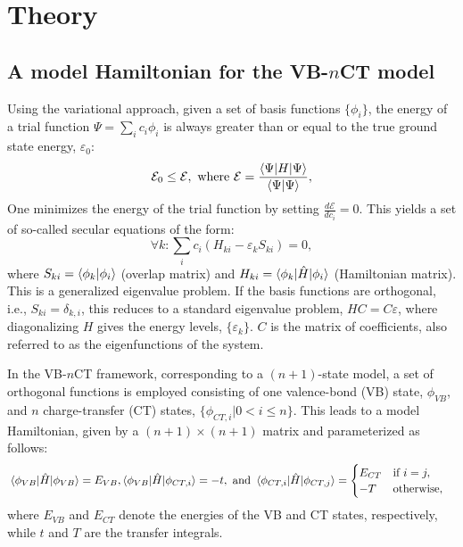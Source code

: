 \documentclass[journal=jpcafh]{achemso}
\begin{document}
\section{Theory \label{sec:theory}}

\subsection{A model Hamiltonian for the VB-$n$CT model}

Using the variational approach, given a set of basis functions $\{\phi_i\}$, the energy of a trial function $\Psi = \sum_i c_i \phi_i$ is always greater than or equal to the true ground state energy, $\varepsilon_0$:\begin{equation}
	\mathcal E_0 \leq 	\mathcal E, \text{ where }	\mathcal E = \frac{\braket{\Psi|H|\Psi}}{\braket{\Psi|\Psi}}, \label{eq:variational}
\end{equation}
One minimizes the energy of the trial function by setting $\frac{d	\mathcal E}{dc_i} = 0$. 
This yields a set of so-called secular equations of the form:\begin{equation}
	\forall k: \sum_i c_i (H_{ki} - \varepsilon_k S_{ki}) = 0, 
\end{equation}
where $S_{ki} = \braket{\phi_k | \phi_i}$ (overlap matrix) and $H_{ki} = \braket{\phi_k | \hat{H} | \phi_i}$ (Hamiltonian matrix). 
This is a generalized eigenvalue problem. 
If the basis functions are orthogonal, i.e., $S_{ki} = \delta_{k,i}$, this reduces to a standard eigenvalue problem, $HC=C\varepsilon$, where diagonalizing $H$ gives the energy levels, $\{\varepsilon_k \}$. $C$ is the matrix of coefficients, also referred to as the eigenfunctions of the system.

In the VB-$n$CT framework, corresponding to a $(n+1)$-state model, a set of orthogonal functions is employed consisting of one valence-bond (VB) state, $\phi_{VB}$, and $n$ charge-transfer (CT) states, $\{\phi_{CT,i}|0<i\leq n\}$. This leads to a model Hamiltonian, given by a $(n+1)\times(n+1)$ matrix and parameterized as follows:
\begin{align}
	&\braket{\phi_{VB}|\hat{H}|\phi_{VB}} = E_{VB}, 
	\braket{\phi_{VB}|\hat{H}|\phi_{CT,i}} = -t, \text{ and } 
	\braket{\phi_{CT,i}|\hat{H}|\phi_{CT,j}} = \begin{cases}
		E_{CT} & \text{if } i=j,\\
		-T & \text{otherwise},
	\end{cases}\label{eq:hamilonian}
\end{align}
where $E_{VB}$ and $E_{CT}$ denote the energies of the VB and CT states, respectively, while $t$ and $T$ are the transfer integrals. 
\end{document}
